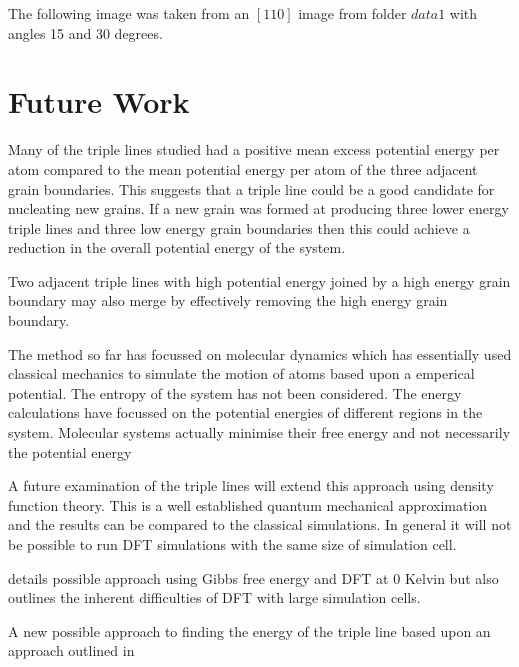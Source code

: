 \documentclass[12pt,a4paper]{book}
\begin{document}
The following image was taken from an $[1 1 0]$ image from folder $data1$ with angles 15 and 30 degrees.


\section{Future Work} \label{sec:FutureWork}


Many of the triple lines studied had a positive mean excess potential energy per atom compared to the mean potential energy per atom of the three adjacent grain boundaries. This suggests that a triple line could be a good candidate for nucleating new grains. If a new grain was formed at producing three lower energy triple lines and three low energy grain boundaries then this could achieve a reduction in the overall potential energy of the system.

Two adjacent triple lines with high potential energy joined by a high energy grain boundary may also merge by effectively removing the high energy grain boundary. 


The method so far has focussed on molecular dynamics which has essentially used classical mechanics to simulate the motion of atoms based upon a emperical potential. The entropy of the system has not been considered. The energy calculations have focussed on the potential energies of different regions in the system. Molecular systems actually minimise their free energy and not necessarily the potential energy 

A future examination of the triple lines will extend this approach using density function theory. This is a well established quantum mechanical approximation and the results can be compared to the classical simulations. In general it will not be possible to run DFT simulations with the same size of simulation cell.

\cite{HASHIBON2010939} details possible approach using Gibbs free energy and DFT at 0 Kelvin but also outlines the inherent difficulties of DFT with large simulation cells.

A new possible approach to finding the energy of the triple line based upon an approach outlined in \cite{Lee2004}

  

 
\end{document}
